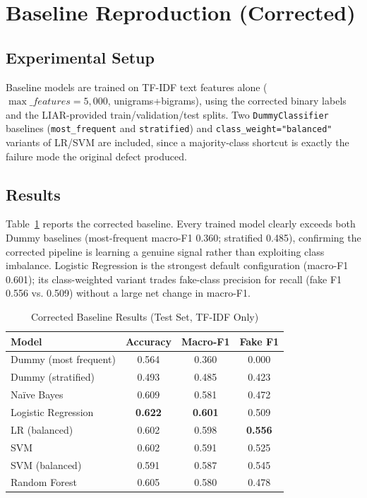 \documentclass[conference]{IEEEtran}
\begin{document}
\section{Baseline Reproduction (Corrected)}
\subsection{Experimental Setup}
Baseline models are trained on TF-IDF text features alone ($\max\_features=5{,}000$,
unigrams+bigrams), using the corrected binary labels and the LIAR-provided
train/validation/test splits. Two \texttt{DummyClassifier} baselines
(\texttt{most\_frequent} and \texttt{stratified}) and \texttt{class\_weight="balanced"}
variants of LR/SVM are included, since a majority-class shortcut is exactly the
failure mode the original defect produced.

\subsection{Results}
Table~\ref{tab:baseline} reports the corrected baseline. Every trained model
clearly exceeds both Dummy baselines (most-frequent macro-F1 0.360; stratified
0.485), confirming the corrected pipeline is learning a genuine signal rather than
exploiting class imbalance. Logistic Regression is the strongest default
configuration (macro-F1 0.601); its class-weighted variant trades fake-class
precision for recall (fake F1 0.556 vs. 0.509) without a large net change in
macro-F1.

\begin{table}[!t]
\caption{Corrected Baseline Results (Test Set, TF-IDF Only)}
\label{tab:baseline}
\centering
\begin{tabular}{lccc}
\toprule
Model & Accuracy & Macro-F1 & Fake F1 \\
\midrule
Dummy (most frequent) & 0.564 & 0.360 & 0.000 \\
Dummy (stratified)    & 0.493 & 0.485 & 0.423 \\
Na\"ive Bayes         & 0.609 & 0.581 & 0.472 \\
Logistic Regression   & \textbf{0.622} & \textbf{0.601} & 0.509 \\
LR (balanced)          & 0.602 & 0.598 & \textbf{0.556} \\
SVM                    & 0.602 & 0.591 & 0.525 \\
SVM (balanced)         & 0.591 & 0.587 & 0.545 \\
Random Forest          & 0.605 & 0.580 & 0.478 \\
\bottomrule
\end{tabular}
\end{table}
\end{document}
